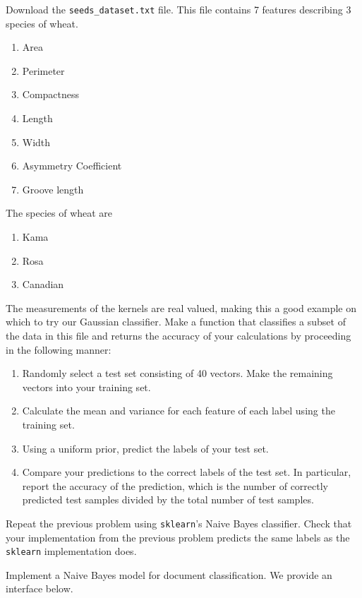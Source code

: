 
Download the {\tt seeds\_dataset.txt} file.
This file contains 7 features describing 3 species of wheat.
\begin{enumerate}
\item Area
\item Perimeter
\item Compactness
\item Length
\item Width
\item Asymmetry Coefficient
\item Groove length
\end{enumerate}

The species of wheat are
\begin{enumerate}
\item Kama
\item Rosa
\item Canadian
\end{enumerate}

The measurements of the kernels are real valued, making this a good example on which to try our Gaussian classifier.
Make a function that classifies a subset of the data in this file and returns the accuracy of your calculations by proceeding in the following manner:
\begin{enumerate}
\item Randomly select a test set consisting of 40 vectors.  Make the remaining vectors into your training set.
\item Calculate the mean and variance for each feature of each label using the training set.
\item Using a uniform prior, predict the labels of your test set.
\item Compare your predictions to the correct labels of the test set. In particular, report the accuracy of the prediction,
which is the number of correctly predicted test samples divided by the total number of test samples.
\end{enumerate}



Repeat the previous problem using {\tt sklearn}'s Naive Bayes classifier.
Check that your implementation from the previous problem predicts the same labels as the {\tt sklearn}
implementation does.


Implement a Naive Bayes model for document classification.
We provide an interface below.

